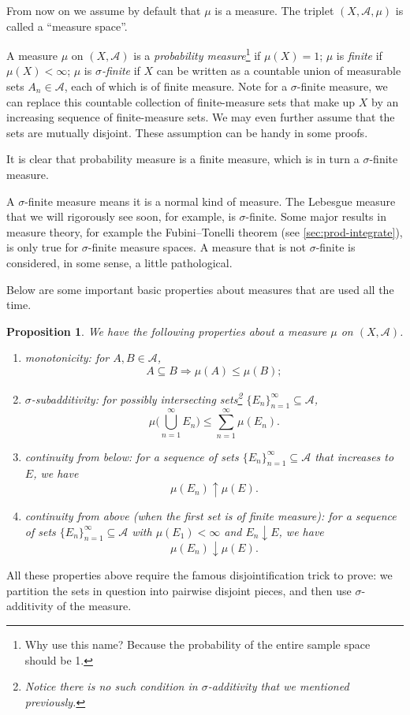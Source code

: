 \documentclass[10pt]{article}
\numberwithin{equation}{section}
\theoremstyle{plain-star}
\newtheorem{prop}[equation]{Proposition}
\theoremstyle{definition-star}
\theoremstyle{remark-star}
\theoremstyle{plain-star}
\newcommand{\A}{\mathcal{A}}
\renewcommand{\implies}{\Rightarrow}
\newcommand{\df}[1]{\textit{#1}}
\begin{document}
From now on we assume by default that $\mu$ is a measure. The triplet $(X,\A,\mu)$ is called a ``measure space''.

A measure $\mu$ on $(X,\A)$ is a \df{probability measure}\footnote{Why use this name? Because the probability of the entire sample space should be 1.} if $\mu(X) = 1$; $\mu$ is \df{finite} if $\mu(X) < \infty$; $\mu$ is \df{$\sigma$-finite} if $X$ can be written as a countable union of measurable sets $A_n \in \A$, each of which is of finite measure. Note for a $\sigma$-finite measure, we can replace this countable collection of finite-measure sets that make up $X$ by an increasing sequence of finite-measure sets. We may even further assume that the sets are mutually disjoint. These assumption can be handy in some proofs.

It is clear that probability measure is a finite measure, which is in turn a $\sigma$-finite measure.

A $\sigma$-finite measure means it is a normal kind of measure. The Lebesgue measure that we will rigorously see soon, for example, is $\sigma$-finite. Some major results in measure theory, for example the Fubini--Tonelli theorem (see \cref{sec:prod-integrate}), is only true for $\sigma$-finite measure spaces. A measure that is not $\sigma$-finite is considered, in some sense, a little pathological.

Below are some important basic properties about measures that are used all the time.
\begin{prop}\label{prop:basic-properties-measure}
    We have the following properties about a measure $\mu$ on $(X,\A)$.
    \begin{enumerate}
        \item monotonicity: for $A,B\in \A$, \[
            A\subseteq B \implies \mu(A)\leq \mu(B);
        \]
        \item $\sigma$-subadditivity: for possibly intersecting sets\footnote{Notice there is no such condition in $\sigma$-additivity that we mentioned previously.} $\{E_n\}_{n=1}^\infty \subseteq \A$, \[
            \mu\biggl(\bigcup_{n=1}^\infty E_n\biggr) \leq \sum_{n=1}^\infty \mu(E_n).
        \]
        \item continuity from below: for a sequence of sets $\{E_n\}_{n=1}^\infty \subseteq \A$ that increases to $E$, we have \[
            \mu(E_n) \uparrow \mu(E).
        \]
        \item continuity from above (when the first set is of finite measure): for a sequence of sets $\{E_n\}_{n=1}^\infty \subseteq \A$ with $\mu(E_1)<\infty$ and $E_n \downarrow E$, we have \[
             \mu(E_n) \downarrow \mu(E).
        \]
    \end{enumerate}
\end{prop}
All these properties above require the famous disjointification trick to prove: we partition the sets in question into pairwise disjoint pieces, and then use $\sigma$-additivity of the measure.
\end{document}
